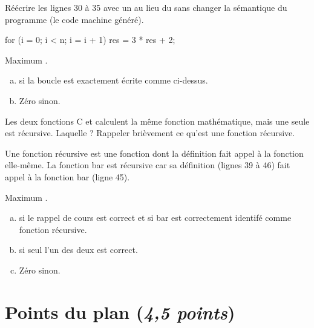 \question Réécrire les lignes 30 à 35 avec un  au lieu du
 sans changer la sémantique du programme (le code machine
généré). 

\begin{correction}
  \begin{small}
    \begin{listing}{30}
      for (i = 0; i < n; i = i + 1)
      {
            res = 3 * res + 2;    
      }

     
    \end{listing}
  \end{small}
\end{correction}

\begin{baremeenv}
  Maximum .
  \begin{enumerate}[(a)]
\item {} si la boucle est exactement écrite comme ci-dessus.
\item Zéro sinon.
  \end{enumerate}
\end{baremeenv}


\question Les deux fonctions C  et  calculent la même
fonction mathématique, mais une seule est récursive. Laquelle ? Rappeler
brièvement ce qu'est une fonction récursive. 

\begin{correction}
  Une fonction récursive est une fonction dont la définition fait
  appel à la fonction elle-même. La fonction  bar est récursive car sa
  définition (lignes 39 à 46) fait appel à la fonction bar (ligne 45).
\end{correction}

\begin{baremeenv}
  Maximum .
  \begin{enumerate}[(a)]
\item {}
    si le rappel de cours est correct et si bar est correctement
    identifé comme fonction récursive. 
\item {} si seul l'un des deux est correct. 
\item Zéro sinon.
  \end{enumerate}
\end{baremeenv}

\section{Points du plan (\textit{4,5 points})}

